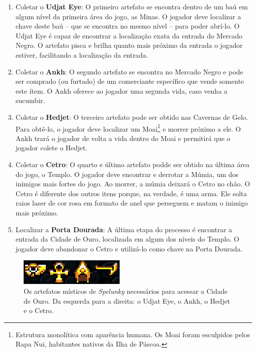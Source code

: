 \begin{enumerate}
	\item Coletar o \textbf{Udjat Eye}: O primeiro artefato se encontra dentro
	de um baú em algum nível da primeira área do jogo, as Minas. O jogador deve
	localizar a chave deste baú -- que se encontra no mesmo nível -- para poder
	abrí-lo. O Udjat Eye é capaz de encontrar a localização exata da entrada do
	Mercado Negro. O artefato pisca e brilha quanto mais próximo da entrada o
	jogador estiver, facilitando a localização da entrada.

	\item Coletar o \textbf{Ankh}: O segundo artefato se encontra no Mercado
	Negro e pode ser comprado (ou furtado) de um comerciante específico que
	vende somente este ítem. O Ankh oferece ao jogador uma segunda vida, caso
	venha a sucumbir.

	\item Coletar o \textbf{Hedjet}: O terceiro artefato pode ser obtido nas
	Cavernas de Gelo. Para obtê-lo, o jogador deve localizar um Moai\footnote{
	Estrutura monolítica com aparência humana. Os Moai foram esculpidos pelos
	Rapa Nui, habitantes nativos da Ilha de Páscoa.} e morrer próximo a ele. O
	Ankh trará o jogador de volta a vida dentro do Moai e permitirá que o
	jogador colete o Hedjet.

	\item Coletar o \textbf{Cetro}: O quarto e último artefato podde ser obtido
	na última área do jogo, o Templo. O jogador deve encontrar e derrotar a
	Múmia, um dos inimigos mais fortes do jogo. Ao morrer, a múmia deixará o
	Cetro no chão. O Cetro é diferente dos outros itens porque, na verdade, é
	uma arma. Ele solta raios laser de cor rosa em formato de anel que perseguem
	e matam o inimigo mais próximo.

	\item Localizar a \textbf{Porta Dourada}: A última etapa do processo é
	encontrar a entrada da Cidade de Ouro, localizada em algum dos níveis do
	Templo. O jogador deve abandonar o Cetro e utilizá-lo como chave na Porta
	Dourada.
\end{enumerate}

\begin{figure}[htb!]
\centering
\includegraphics[width=.65\textwidth]{fig/spelunky-artifacts.png}
\caption{\label{fig:spelunky-artifacts}Os artefatos místicos de
\textit{Spelunky} necessários para acessar a Cidade de Ouro. Da esquerda para a
direita: o Udjat Eye, o Ankh, o Hedjet e o Cetro.}
\end{figure}

